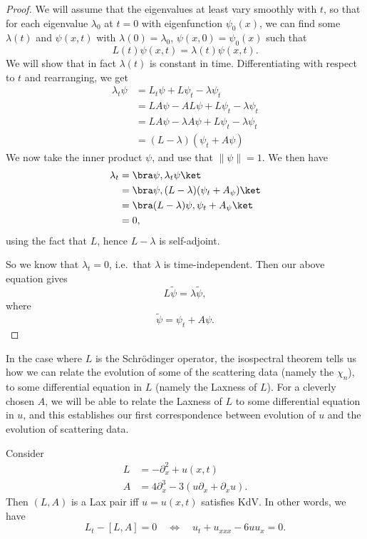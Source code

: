 \documentclass[a4paper]{article}
\begin{document}
\begin{proof}
  We will assume that the eigenvalues at least vary smoothly with $t$, so that for each eigenvalue $\lambda_0$ at $t = 0$ with eigenfunction $\psi_0(x)$, we can find some $\lambda(t)$ and $\psi(x, t)$ with $\lambda(0) = \lambda_0$, $\psi(x, 0) = \psi_0(x)$ such that
  \[
    L(t) \psi(x, t) = \lambda(t) \psi (x, t).
  \]
  We will show that in fact $\lambda(t)$ is constant in time. Differentiating with respect to $t$ and rearranging, we get
  \begin{align*}
    \lambda_t \psi &= L_t \psi + L \psi_t - \lambda \psi_t\\
    &= LA \psi - AL \psi + L \psi_t - \lambda \psi_t\\
    &= LA \psi - \lambda A \psi + L \psi_t - \lambda \psi_t\\
    &= (L - \lambda)(\psi_t + A \psi)
  \end{align*}
  We now take the inner product $\psi$, and use that $\|\psi\| = 1$. We then have
  \begin{align*}
    \lambda_t &= \bra \psi, \lambda_t \psi\ket\\
    &= \bra \psi, (L - \lambda)(\psi_t + A_\psi)\ket\\
    &= \bra (L - \lambda)\psi, \psi_t + A_\psi\ket\\
    &= 0,
  \end{align*}
  using the fact that $L$, hence $L - \lambda$ is self-adjoint.

  So we know that $\lambda_t = 0$, i.e.\ that $\lambda$ is time-independent. Then our above equation gives
  \[
    L \tilde{\psi} = \lambda \tilde{\psi},
  \]
  where
  \[
    \tilde{\psi} = \psi_t + A\psi.
  \]
\end{proof}

In the case where $L$ is the Schr\"odinger operator, the isospectral theorem tells us how we can relate the evolution of some of the scattering data (namely the $\chi_n$), to some differential equation in $L$ (namely the Laxness of $L$). For a cleverly chosen $A$, we will be able to relate the Laxness of $L$ to some differential equation in $u$, and this establishes our first correspondence between evolution of $u$ and the evolution of scattering data.
\begin{eg}
  Consider
  \begin{align*}
    L &= -\partial_x^2 + u(x, t)\\
    A &= 4 \partial_x^3 - 3 (u \partial_x + \partial_x u).
  \end{align*}
  Then $(L, A)$ is a Lax pair iff $u = u(x, t)$ satisfies KdV. In other words, we have
  \[
    L_t - [L, A] = 0 \quad\Longleftrightarrow\quad u_t + u_{xxx} - 6uu_x =0 .
  \]
\end{eg}
\end{document}
